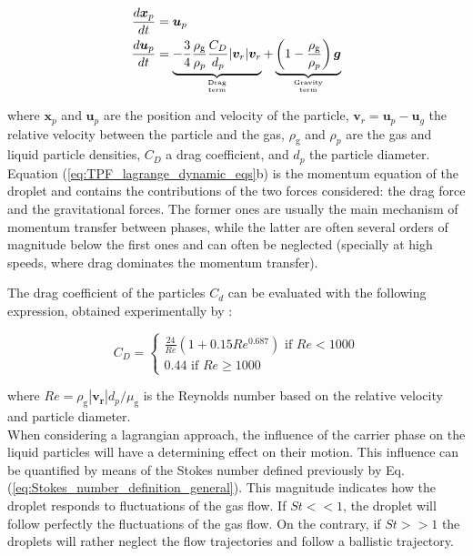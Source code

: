 \begin{subequations}
\label{eq:TPF_lagrange_dynamic_eqs}
\begin{align}
\frac{d \boldsymbol{x}_p}{d t} &= \boldsymbol{u}_p \\
\frac{d \boldsymbol{u}_p}{d t} &= \underbrace{ - \frac{3}{4} \frac{\rho_\mathrm{g}}{\rho_p} \frac{C_D}{d_p} | \boldsymbol{v}_r | \boldsymbol{v}_r }_{\text{Drag}\atop\text{term}}  + \underbrace{ \left( 1 - \frac{\rho_\mathrm{g}}{\rho_p} \right) \boldsymbol{g} }_{\text{Gravity}\atop\text{term}} 
\end{align}
\end{subequations}

where $\textbf{x}_p$ and $\textbf{u}_p$ are the position and velocity of the particle, $\textbf{v}_r = \boldsymbol{u}_p  - \boldsymbol{u}_g$ the relative velocity between the particle and the gas, $\rho_\mathrm{g}$ and $\rho_p$ are the gas and liquid particle densities, $C_D$ a drag coefficient, and $d_p$ the particle diameter. Equation (\ref{eq:TPF_lagrange_dynamic_eqs}b) is the momentum equation of the droplet and contains the contributions of the two forces considered: the drag force and the gravitational forces. The former ones are usually the main mechanism of momentum transfer between phases, while the latter are often several orders of magnitude below the first ones and can often be neglected (specially at high speeds, where drag dominates the momentum transfer). 

The drag coefficient of the particles $C_d$ can be evaluated with the following expression, obtained experimentally by :

\begin{equation}
\label{eq:Re_CD_droplet}
C_D =
\left\{
    \begin{split}
     \frac{24}{Re} \left( 1 + 0.15 Re^{0.687} \right)\,\,\mathrm{if}\,\,Re < 1000 \\ 
    0.44\,\,\mathrm{if}\,\,Re \geq 1000 
    \end{split}
\right.
\end{equation}

where $Re = \rho_\mathrm{g} | \boldsymbol{v_r} | d_p / \mu_\mathrm{g} $ is the Reynolds number based on the relative velocity and particle diameter. \\

When considering a lagrangian approach, the influence of the carrier phase on the liquid particles will have a determining effect on their motion. This influence can be quantified by means of the Stokes number defined previously by Eq. (\ref{eq:Stokes_number_definition_general}). This magnitude indicates how the droplet responds to fluctuations of the gas flow. If $St << 1$, the droplet will follow perfectly the fluctuations of the gas flow. On the contrary, if $St >> 1$ the droplets will rather neglect the flow trajectories and follow a ballistic trajectory. 

